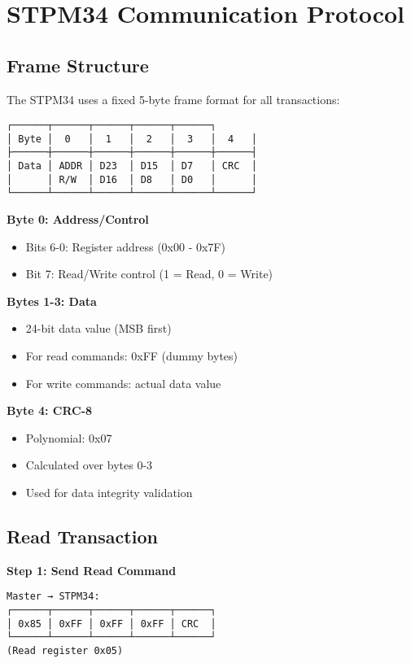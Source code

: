 \documentclass[11pt,a4paper]{article}
\begin{document}
\section{STPM34 Communication Protocol}

\subsection{Frame Structure}

The STPM34 uses a fixed 5-byte frame format for all transactions:

\begin{verbatim}
┌──────┬──────┬──────┬──────┬──────┐
│ Byte │  0   │  1   │  2   │  3   │  4   │
├──────┼──────┼──────┼──────┼──────┼──────┤
│ Data │ ADDR │ D23  │ D15  │ D7   │ CRC  │
│      │ R/W  │ D16  │ D8   │ D0   │      │
└──────┴──────┴──────┴──────┴──────┴──────┘
\end{verbatim}

\textbf{Byte 0: Address/Control}
\begin{itemize}[noitemsep]
    \item Bits 6-0: Register address (0x00 - 0x7F)
    \item Bit 7: Read/Write control (1 = Read, 0 = Write)
\end{itemize}

\textbf{Bytes 1-3: Data}
\begin{itemize}[noitemsep]
    \item 24-bit data value (MSB first)
    \item For read commands: 0xFF (dummy bytes)
    \item For write commands: actual data value
\end{itemize}

\textbf{Byte 4: CRC-8}
\begin{itemize}[noitemsep]
    \item Polynomial: 0x07
    \item Calculated over bytes 0-3
    \item Used for data integrity validation
\end{itemize}

\subsection{Read Transaction}

\textbf{Step 1: Send Read Command}
\begin{verbatim}
Master → STPM34:
┌──────┬──────┬──────┬──────┬──────┐
│ 0x85 │ 0xFF │ 0xFF │ 0xFF │ CRC  │
└──────┴──────┴──────┴──────┴──────┘
(Read register 0x05)
\end{verbatim}
\end{document}
